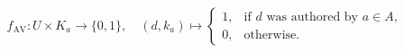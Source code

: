 \begin{equation}
f_{\text{AV}} : U \times K_a \to \{0,1\}, \quad 
(d, k_a) \mapsto 
\begin{cases} 
1, & \text{if } d \text{ was authored by } a \in A,\\[6pt]
0, & \text{otherwise.}
\end{cases}
\label{eq:authorship_verification_function}
\end{equation}









